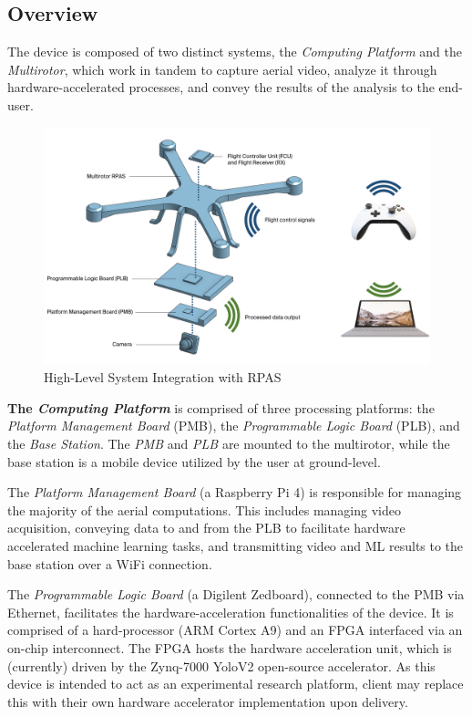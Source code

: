 \subsection{Overview}
The device is composed of two distinct systems, the \textit{Computing Platform} and the \textit{Multirotor}, which work in tandem to capture aerial video, analyze it through hardware-accelerated processes, and convey the results of the analysis to the end-user. 

\begin{figure}[H]\label{hlpic}
    \centering
    \includegraphics[width=\linewidth]{img/intpic.png}
\caption{High-Level System Integration with RPAS}
\end{figure}

\textbf{The \textit{Computing Platform}} is comprised of three processing platforms: the \textit{Platform Management Board} (PMB), the \textit{Programmable Logic Board} (PLB), and the \textit{Base Station}. The \textit{PMB} and \textit{PLB} are mounted to the multirotor, while the base station is a mobile device utilized by the user at ground-level.

The \textit{Platform Management Board} (a Raspberry Pi 4) is responsible for managing the majority of the aerial computations. This includes managing video acquisition, conveying data to and from the PLB to facilitate hardware accelerated machine learning tasks, and transmitting video and ML results to the base station over a WiFi connection.

The \textit{Programmable Logic Board} (a Digilent Zedboard), connected to the PMB via Ethernet, facilitates the hardware-acceleration functionalities of the device. It is comprised of a hard-processor (ARM Cortex A9) and an FPGA interfaced via an on-chip interconnect. The FPGA hosts the hardware acceleration unit, which is (currently) driven by the Zynq-7000 YoloV2 open-source accelerator\cite{yolov2accel}. As this device is intended to act as an experimental research platform, client may replace this with their own hardware accelerator implementation upon delivery.

